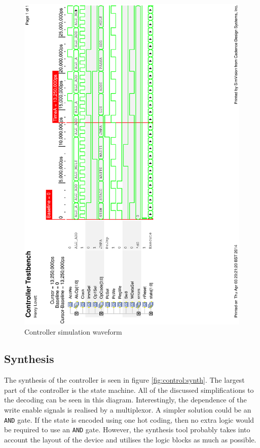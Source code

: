 \begin{figure}
\includegraphics[height=\textheight]{Figures/controllersim.eps}
\caption{Controller simulation waveform}
\label{fig:controllersim}
\end{figure}


\subsection{Synthesis}


The synthesis of the controller is seen in figure \ref{fig:control:synth}.
The largest part of the controller is the state machine. 
All of the discussed simplifications to the decoding can be seen in this diagram.
Interestingly, the dependence of the write enable signals is realised by a multiplexor.
A simpler solution could be an \texttt{AND} gate. 
If the state is encoded using one hot coding, then no extra logic would be required to use an \texttt{AND} gate.
However, the synthesis tool probably takes into account the layout of the device and utilises the logic blocks as much as possible.


